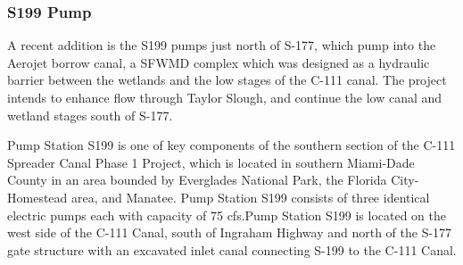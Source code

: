 %
%


\clearpage

\subsubsection{S199 Pump}
A recent addition is the S199 pumps just north of S-177, which pump into the Aerojet borrow canal, a SFWMD complex which was designed as a hydraulic barrier between the wetlands and the low stages of the C-111 canal.
The project intends to enhance flow through Taylor Slough, and continue the low canal and wetland stages south of S-177.

Pump Station S199 is one of key components of the southern section of the C-111 Spreader Canal Phase 1 Project, which is located in southern Miami-Dade County in an area bounded by Everglades National Park, the Florida City-Homestead area, and Manatee. Pump Station S199 consists of three identical electric pumps each with capacity of 75 cfs.Pump Station S199 is located on the west side of the C-111 Canal, south of Ingraham Highway and north of the S-177 gate structure with an excavated inlet canal connecting S-199 to the C-111 Canal.

